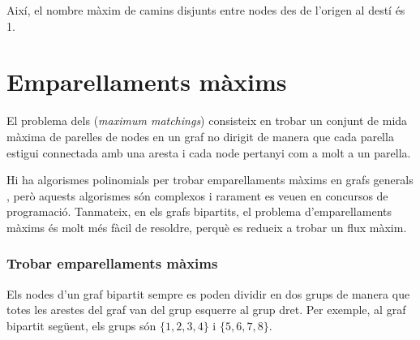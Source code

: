 Així, el nombre màxim de camins disjunts entre nodes des de l'origen al
destí és 1.

\section{Emparellaments màxims}

 

El problema dels  (\emph{maximum
matchings}) consisteix en trobar un conjunt de mida màxima de parelles de
nodes en un graf no dirigit de manera que cada parella estigui
connectada amb una aresta i cada node pertanyi com a molt a un parella.

Hi ha algorismes polinomials per trobar emparellaments màxims en grafs
generals \cite{edm65}, però aquests algorismes són complexos i
rarament es veuen en concursos de programació. Tanmateix, en els grafs
bipartits, el problema d'emparellaments màxims és molt més fàcil de
resoldre, perquè es redueix a trobar un flux màxim.

\subsubsection{Trobar emparellaments màxims}

Els nodes d'un graf bipartit sempre es poden dividir en dos grups de
manera que totes les arestes del graf van del grup esquerre al grup
dret. Per exemple, al graf bipartit següent, els grups són
$\{1,2,3,4\}$ i $\{5,6,7,8\}$.


